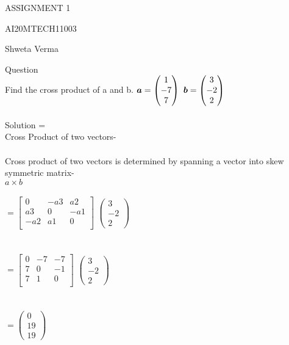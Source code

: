 \documentclass[11pt]{article}
\newcommand{\myvec}[1]{\ensuremath{\begin{pmatrix}#1\end{pmatrix}}}
\renewcommand{\vec}[1]{\boldsymbol{#1}}
\begin{document}
\begin{center}
\large ASSIGNMENT 1

AI20MTECH11003

Shweta Verma
\\
\end{center}




\large Question
\\

Find the cross product of a and b.
$
\\
\\
\vec{a} = \myvec{1\\-7\\7}
$
$
\\
\\
\\
\vec{b} = \myvec{3\\-2\\2}
$
\\
\\
\large Solution =
\\
Cross Product of two vectors- 
\\
\\
Cross product of two vectors is determined by spanning a vector into skew symmetric matrix-
\\
$a \times b$
\\
\\
$
= \begin{bmatrix}
   0 & -a3 & a2\\
   a3 & 0 & -a1\\
   -a2 & a1 & 0\\
\end{bmatrix}
$
$
\myvec{3\\-2\\2}
$
\\
\\
\\
$
= \begin{bmatrix}
  0 & -7 & -7\\
  7 & 0 & -1\\
  7 & 1 & 0\\
\end{bmatrix}
$
$
\myvec{3\\-2\\2}
$
\\
\\
\\
$
=\myvec{0\\19\\19}
$
\end{document}
